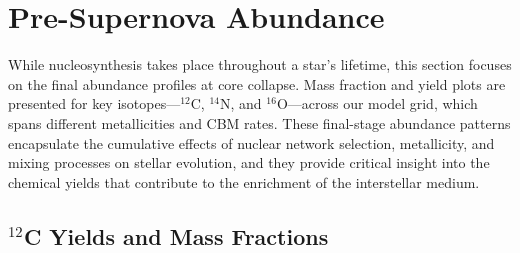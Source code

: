 \clearpage

\section{Pre-Supernova Abundance}
While nucleosynthesis takes place throughout a star's lifetime, this section focuses on the final abundance profiles at core collapse. Mass fraction and yield plots are presented for key isotopes—$^{12}$C, $^{14}$N, and $^{16}$O—across our model grid, which spans different metallicities and CBM rates. These final-stage abundance patterns encapsulate the cumulative effects of nuclear network selection, metallicity, and mixing processes on stellar evolution, and they provide critical insight into the chemical yields that contribute to the enrichment of the interstellar medium.


\subsection{$^{12}$C Yields and Mass Fractions}


